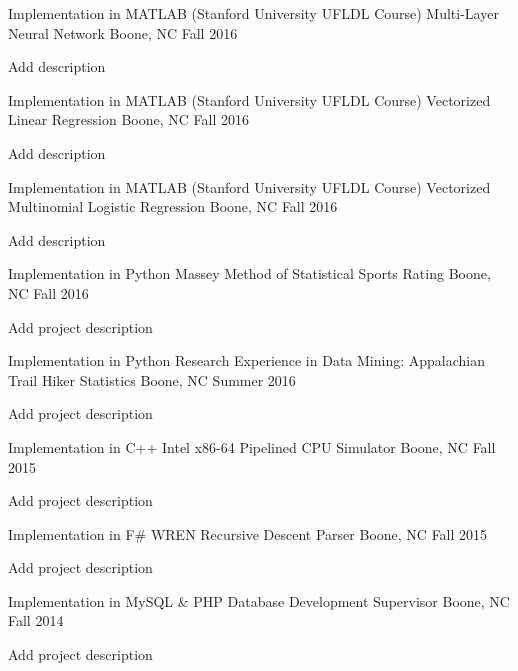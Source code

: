 \begin{cventries}
  \cventry
    {Implementation in MATLAB (Stanford University UFLDL Course)}
    {Multi-Layer Neural Network}
    {Boone, NC}
    {Fall 2016}
    {
      \begin{cvitems}
        \item {Add description}
      \end{cvitems}
    }
    \cventry
    {Implementation in MATLAB (Stanford University UFLDL Course)}
    {Vectorized Linear Regression}
    {Boone, NC}
    {Fall 2016}
    {
        \begin{cvitems}
            \item {Add description}
        \end{cvitems}
    }
    \cventry
    {Implementation in MATLAB (Stanford University UFLDL Course)}
    {Vectorized Multinomial Logistic Regression}
    {Boone, NC}
    {Fall 2016}
    {
        \begin{cvitems}
            \item {Add description}
        \end{cvitems}
    }
    \cventry
    {Implementation in Python}
    {Massey Method of Statistical Sports Rating}
    {Boone, NC}
    {Fall 2016}
    {
        \begin{cvitems}
            \item {Add project description}
        \end{cvitems}
    }
    \cventry
    {Implementation in Python}
    {Research Experience in Data Mining: Appalachian Trail Hiker Statistics}
    {Boone, NC}
    {Summer 2016}
    {
        \begin{cvitems}
            \item {Add project description}
        \end{cvitems}
    }
    \cventry
    {Implementation in C++}
    {Intel x86-64 Pipelined CPU Simulator}
    {Boone, NC}
    {Fall 2015}
    {
        \begin{cvitems}
            \item {Add project description}
        \end{cvitems}
    }
    \cventry
    {Implementation in F\#}
    {WREN Recursive Descent Parser}
    {Boone, NC}
    {Fall 2015}
    {
        \begin{cvitems}
            \item {Add project description}
        \end{cvitems}
    }
    \cventry
    {Implementation in MySQL \& PHP}
    {Database Development Supervisor}
    {Boone, NC}
    {Fall 2014}
    {
        \begin{cvitems}
            \item {Add project description}
        \end{cvitems}
    }
\end{cventries}
